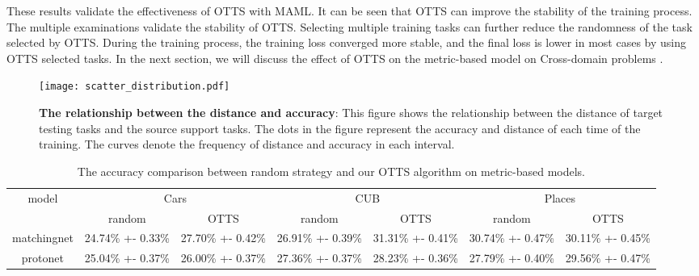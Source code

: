 \documentclass[10pt,journal,compsoc]{IEEEtran}
\begin{document}
These results validate the effectiveness of OTTS with MAML. It can be seen that OTTS can improve the stability of the training process. The multiple examinations validate the stability of OTTS. Selecting multiple training tasks can further reduce the randomness of the task selected by OTTS. During the training process, the training loss converged more stable, and the final loss is lower in most cases by using OTTS selected tasks. In the next section, we will discuss the effect of OTTS on the metric-based model on Cross-domain problems \cite{Cross_domain,Cross_domain_2}.

\begin{figure}[!t]
\centering
\texttt{[image: scatter\_distribution.pdf]}
\caption{\textbf{The relationship between the distance and accuracy}: This figure shows the relationship between the distance of target testing tasks and the source support tasks. The dots in the figure represent the accuracy and distance of each time of the training. The curves denote the frequency of distance and accuracy in each interval.}
\label{distribution_accuracy}
\end{figure}

\begin{table*}[!t]
\renewcommand{\arraystretch}{1.8}
\caption{The accuracy comparison between random strategy and our OTTS algorithm on metric-based models.}
\label{acc_table}
\centering
\begin{tabular}{ccccccc}
\toprule
\multirow{2}{*}{model}&\multicolumn{2}{c}{Cars}&\multicolumn{2}{c}{CUB}&\multicolumn{2}{c}{Places}\\
\cmidrule(r){2-3} \cmidrule(r){4-5} \cmidrule(r){6-7}
                    &random    &OTTS        &random     &OTTS    &random     &OTTS \\ 
\midrule
matchingnet        &24.74\% +- 0.33\%      &27.70\% +- 0.42\%   &26.91\% +- 0.39\%  &31.31\% +- 0.41\% &30.74\% +- 0.47\%        &30.11\% +- 0.45\%\\
protonet          &25.04\% +- 0.37\%    &26.00\% +- 0.37\%      &27.36\% +- 0.37\%
    &28.23\% +- 0.36\%      &27.79\% +- 0.40\%   &29.56\% +- 0.47\%\\
\bottomrule
\end{tabular}
\end{table*}
\end{document}
